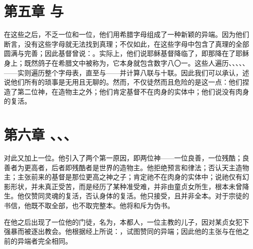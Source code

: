 \section{第五章 与}

在这些之后，不乏一位和一位，他们用希腊字母组成了一种新颖的异端。因为他们断言，没有这些字母就无法找到真理；不仅如此，在这些字母中包含了真理的全部圆满与完善；因此基督曾说：。实际上，他们说耶稣基督降临了，即那降在了耶稣身上；既然鸽子在希腊文中被称为，它本身就包含数字八〇一。这些人遍历、、、、、——实则遍历整个字母表，直至与——并计算八联与十联。因此我们可以承认，述说他们所有的琐事是无用且无聊的。然而，不仅徒然而且危险的是这一点：他们捏造了第二位神，在造物主之外；他们肯定基督不在肉身的实体中；他们说没有肉身的复活。\par


\section{第六章 、、、}

对此又加上一位。他引入了两个第一原因，即两位神——一位良善，一位残酷；良善者为更高者，后者即残酷者是世界的造物主。他拒绝预言和律法；否认天主造物主；主张前来的基督是那位更高之神之子；肯定祂不在肉身的实体中；说祂仅有幻影形状，并未真正受苦，而是经历了某种准受难，并非由童贞女所生，根本未曾降生。他仅赞同灵魂的复活，否认身体的复活。他只接受，且并非全本。对于宗徒的书信，他既不取全部，也不取完整本。他将和斥为伪书。\par

在他之后出现了一位他的门徒，名为，本都人，一位主教的儿子，因对某贞女犯下强暴而被逐出教会。他根据经上所说：，试图赞同的异端；因此他的主张与在他之前的异端者完全相同。\par

